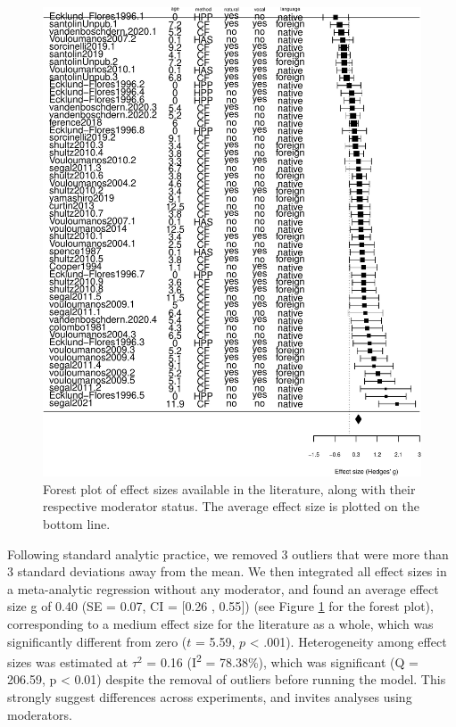 \documentclass[
  man,mask,floatsintext]{apa6}
\begin{document}
\begin{figure}
\centering
\includegraphics{MA_speech_pref_files/figure-latex/forest-1.pdf}
\caption{\label{fig:forest}Forest plot of effect sizes available in the literature, along with their respective moderator status. The average effect size is plotted on the bottom line.}
\end{figure}

Following standard analytic practice, we removed 3 outliers that were more than 3 standard deviations away from the mean. We then integrated all effect sizes in a meta-analytic regression without any moderator, and found an average effect size g of 0.40 (SE = 0.07, CI = {[}0.26 , 0.55{]}) (see Figure \ref{fig:forest} for the forest plot), corresponding to a medium effect size for the literature as a whole, which was significantly different from zero (\(t\) = 5.59, \(p\) \textless{} .001).
Heterogeneity among effect sizes was estimated at \(\tau^2\) = 0.16 (I\textsuperscript{2} = 78.38\%), which was significant (Q = 206.59, p \textless{} 0.01) despite the removal of outliers before running the model. This strongly suggest differences across experiments, and invites analyses using moderators.
\end{document}
